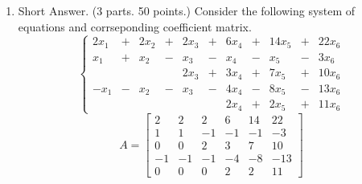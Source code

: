 \documentclass[10pt]{amsart}
\begin{document}
\begin{enumerate}
\begin{enumerate}
\begin{figure}[h]
\end{figure}

\vfill\pagebreak


\item  You have computed the volume of a cone of height $3$ with 
radius $1$.  Suppose this cone is
weighted at the tip, and is floating as a buoy in the water (see
figure).  The cone is weighted in such a way that $\frac{1}{4}$ of its 
volume is below the surface of the water.  If $x$ is the height of the 
portion below the water, then the volume of the portion below the
water is
$$
V_x=\frac{\pi x^3}{27}.
$$
If $V$ is the total volume of the cone (which you computed above),
then use Newton's method to solve the equation
$$
\frac{\pi x^3}{27}=\frac{V}{4}\ \longrightarrow\ \frac{\pi x^3}{27}-\frac{V}{4}=0
$$
for the zero.  This $x$ will be the height of the portion under the
water.  Do two (2) iterations of Newton's method ({\sc Hint:} the root 
is between $1$ and $2$.  You will not get an integer answer!)

\begin{figure}[h]
\end{figure}

\vfill\pagebreak



\end{enumerate}

\begin{center}
{\sc Linear Algebra}
\end{center}



\item {\sc Short Answer.} (3 parts.  50 points.) Consider the following
system of equations and corrseponding coefficient matrix.
$$
\left\{\begin{array}{ccccccccccc}
2x_1 & + & 2x_2&+&2x_3&+&6x_4&+&14x_5&+&22x_6\\
x_1 & + & x_2 & - & x_3 & - & x_4 & - &  x_5 & - & 3x_6\\
 &  & &  & 2x_3 & +& 3x_4 & + &  7x_5 & + & 10x_6\\
-x_1 & - & x_2 & - & x_3 & - & 4x_4 & - &  8x_5 & - & 13x_6\\
 &  &  &  &  & & 2x_4 & + &  2x_5 & + & 11x_6
\end{array}\right.
$$
\vskip 0.5in
$$
A=\left[\begin{array}{rrrrrr}
2&2&2&6&14&22\\
1&1&-1&-1&-1&-3\\
0&0&2&3&7&10\\
-1&-1&-1&-4&-8&-13\\
0&0&0&2&2&11
      \end{array}\right]
$$


\end{enumerate}
\end{document}
